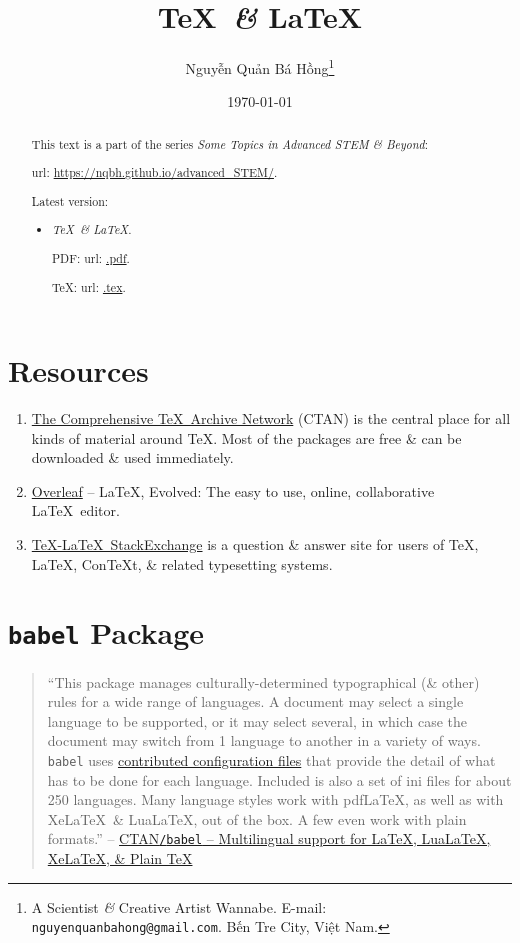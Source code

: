 \documentclass{article}
\title{\TeX\ {\it\&} \LaTeX}
\author{Nguyễn Quản Bá Hồng\footnote{A Scientist {\it\&} Creative Artist Wannabe. E-mail: {\tt nguyenquanbahong@gmail.com}. Bến Tre City, Việt Nam.}}
\date{\today}
\begin{document}
\maketitle
\begin{abstract}
	This text is a part of the series {\it Some Topics in Advanced STEM \& Beyond}:
	
	{\sc url}: \url{https://nqbh.github.io/advanced_STEM/}.
	
	Latest version:
	\begin{itemize}
		\item {\it \TeX\ \& \LaTeX}.
		
		PDF: {\sc url}: \url{.pdf}.
		
		\TeX: {\sc url}: \url{.tex}.
	\end{itemize}
\end{abstract}
\tableofcontents


\section*{Resources}

\begin{enumerate}
	\item \href{https://ctan.org/}{The Comprehensive \TeX\ Archive Network} (CTAN) is the central place for all kinds of material around \TeX. Most of the packages are free \& can be downloaded \& used immediately.
	\item \href{https://www.overleaf.com/}{Overleaf} -- \LaTeX, Evolved: The easy to use, online, collaborative \LaTeX\ editor.
	\item \href{https://tex.stackexchange.com/}{\TeX-\LaTeX\ StackExchange} is a question \& answer site for users of \TeX, \LaTeX, ConTeXt, \& related typesetting systems.
\end{enumerate}


\section{\texttt{babel} Package}
\begin{quotation}
	``This package manages culturally-determined typographical (\& other) rules for a wide range of languages. A document may select a single language to be supported, or it may select several, in which case the document may switch from 1 language to another in a variety of ways. \texttt{babel} uses \href{https://ctan.org/pkg/babel-contrib}{contributed configuration files} that provide the detail of what has to be done for each language. Included is also a set of ini files for about 250 languages. Many language styles work with pdf\LaTeX, as well as with Xe\LaTeX\ \& Lua\LaTeX, out of the box. A few even work with plain formats.'' -- \href{https://ctan.org/pkg/babel}{CTAN\texttt{/}\texttt{babel} -- Multilingual support for \LaTeX, Lua\LaTeX, Xe\LaTeX, \& Plain \TeX}
\end{quotation}
\end{document}
